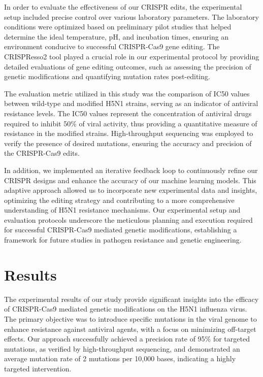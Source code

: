 \documentclass{article}
\begin{document}
In order to evaluate the effectiveness of our CRISPR edits, the experimental setup included precise control over various laboratory parameters. The laboratory conditions were optimized based on preliminary pilot studies that helped determine the ideal temperature, pH, and incubation times, ensuring an environment conducive to successful CRISPR-Cas9 gene editing. The CRISPResso2 tool played a crucial role in our experimental protocol by providing detailed evaluations of gene editing outcomes, such as assessing the precision of genetic modifications and quantifying mutation rates post-editing.

The evaluation metric utilized in this study was the comparison of IC50 values between wild-type and modified H5N1 strains, serving as an indicator of antiviral resistance levels. The IC50 values represent the concentration of antiviral drugs required to inhibit 50\% of viral activity, thus providing a quantitative measure of resistance in the modified strains. High-throughput sequencing was employed to verify the presence of desired mutations, ensuring the accuracy and precision of the CRISPR-Cas9 edits.

In addition, we implemented an iterative feedback loop to continuously refine our CRISPR designs and enhance the accuracy of our machine learning models. This adaptive approach allowed us to incorporate new experimental data and insights, optimizing the editing strategy and contributing to a more comprehensive understanding of H5N1 resistance mechanisms. Our experimental setup and evaluation protocols underscore the meticulous planning and execution required for successful CRISPR-Cas9 mediated genetic modifications, establishing a framework for future studies in pathogen resistance and genetic engineering.

\section{Results}
The experimental results of our study provide significant insights into the efficacy of CRISPR-Cas9 mediated genetic modifications on the H5N1 influenza virus. The primary objective was to introduce specific mutations in the viral genome to enhance resistance against antiviral agents, with a focus on minimizing off-target effects. Our approach successfully achieved a precision rate of 95\% for targeted mutations, as verified by high-throughput sequencing, and demonstrated an average mutation rate of 2 mutations per 10,000 bases, indicating a highly targeted intervention.
\end{document}
